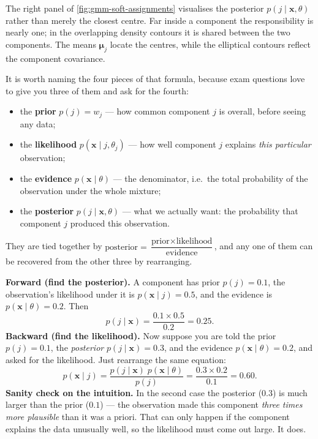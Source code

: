 \documentclass[11pt, oneside]{book}
\begin{document}
The right panel of \cref{fig:gmm-soft-assignments} visualises the posterior
$p(j\mid\bm{x},\theta)$ rather than merely the closest centre. Far inside a
component the responsibility is nearly one; in the overlapping density contours
it is shared between the two components. The means $\bm{\mu}_j$ locate the
centres, while the elliptical contours reflect the component covariance.

It is worth naming the four pieces of that formula, because exam questions love
to give you three of them and ask for the fourth:
\begin{itemize}
  \item the \textbf{prior} $p(j)=w_j$ --- how common component $j$ is overall,
        before seeing any data;
  \item the \textbf{likelihood} $p(\bm{x}\mid j,\theta_j)$ --- how well component
        $j$ explains \emph{this particular} observation;
  \item the \textbf{evidence} $p(\bm{x}\mid\theta)$ --- the denominator, i.e.\ the
        total probability of the observation under the whole mixture;
  \item the \textbf{posterior} $p(j\mid\bm{x},\theta)$ --- what we actually want:
        the probability that component $j$ produced this observation.
\end{itemize}
They are tied together by
$\text{posterior} = \dfrac{\text{prior}\times\text{likelihood}}{\text{evidence}}$,
and any one of them can be recovered from the other three by rearranging.

\begin{exbox}[title={Reading Bayes' rule in both directions}]
\textbf{Forward (find the posterior).}
A component has prior $p(j)=0.1$, the observation's likelihood under it is
$p(\bm{x}\mid j)=0.5$, and the evidence is $p(\bm{x}\mid\theta)=0.2$.
Then
\[
  p(j\mid\bm{x}) = \frac{0.1 \times 0.5}{0.2} = 0.25.
\]
\textbf{Backward (find the likelihood).}
Now suppose you are told the prior $p(j)=0.1$, the \emph{posterior}
$p(j\mid\bm{x})=0.3$, and the evidence $p(\bm{x}\mid\theta)=0.2$, and asked for
the likelihood.
Just rearrange the same equation:
\[
  p(\bm{x}\mid j) = \frac{p(j\mid\bm{x})\;p(\bm{x}\mid\theta)}{p(j)}
  = \frac{0.3 \times 0.2}{0.1} = 0.60.
\]
\textbf{Sanity check on the intuition.}
In the second case the posterior ($0.3$) is much larger than the prior ($0.1$) ---
the observation made this component \emph{three times more plausible} than it was
a priori. That can only happen if the component explains the data unusually well,
so the likelihood must come out large. It does.
\end{exbox}
\end{document}
